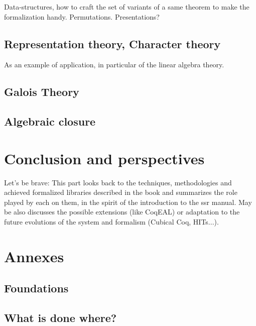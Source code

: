 \documentclass{book}
\begin{document}
Data-structures, how to craft the set of variants of a same theorem to
make the formalization handy. Permutations. Presentations?

\chapter{Representation theory, Character theory}

As an example of application, in particular of the linear algebra
theory.

\chapter{Galois Theory}




\chapter{Algebraic closure}

\part{Conclusion and perspectives}

Let's be brave:
This part looks back to the techniques, methodologies and achieved
formalized libraries described in the book and summarizes the role
played by each on them, in the spirit of the introduction to the ssr manual.
May be also discusses the possible extensions
(like CoqEAL) or adaptation to the future evolutions of the system and
formalism (Cubical Coq, HITs...).

\part{Annexes}

\chapter{Foundations}

\chapter{What is done where?}
\end{document}
